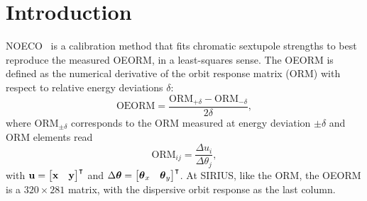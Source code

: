 \documentclass[%
               ]{jacow}
\begin{document}
\section{Introduction}
NOECO~\cite{olsson_nonlinear_2020} is a calibration method that fits chromatic sextupole strengths to best reproduce the measured OEORM, in a least-squares sense.
The OEORM is defined as the numerical derivative of the orbit response matrix (ORM) with respect to relative energy deviations $\delta$:
\begin{equation}
\text{OEORM} = \frac{\text{ORM}_{+\delta} - \text{ORM}_{-\delta}}{2 \delta},
\label{eq:oeorm_def}
\end{equation}
where $\text{ORM}_{\pm \delta}$ corresponds to the ORM measured at energy deviation $\pm\delta$ and ORM elements read
\begin{equation}
    \text{ORM}_{ij} = \frac{\Delta u_i}{\Delta \theta_j},
\end{equation}
with $\vb{u} = \mqty[\vb{x} & \vb{y}]^\intercal$ and $\Delta \boldsymbol{\theta} = \mqty[\boldsymbol{\theta}_x & \boldsymbol{\theta}_y]^\intercal$. 
At SIRIUS, like the ORM, the OEORM is a $320 \times 281$ matrix, with the dispersive orbit response as the last column.

\end{document}
